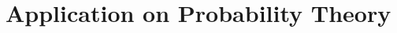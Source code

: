 \documentclass[pmath451]{subfiles}
\begin{document}
    \section{Application on Probability Theory}
    
\end{document}
